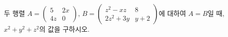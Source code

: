 \hspace*{2mm}\begin{minipage}[t]{\dimexpr\linewidth-2mm\relax}\vspace{0pt}
두 행렬 $A=\begin{pmatrix} 5 & 2x \\ 4z & 0 \end{pmatrix}$, $B=\begin{pmatrix} z^2-xz & 8 \\ 2z^2+3y & y+2 \end{pmatrix}$에 대하여 $A=B$일 때, $x^2+y^2+z^2$의 값을 구하시오. \end{minipage}
